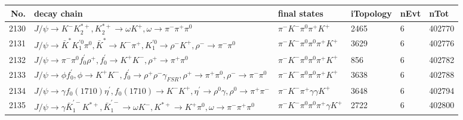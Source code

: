 \begin{table}[htbp] 
\begin{center}
\begin{small}
\begin{tabular}{rlllll}\hline\hline
 No. & decay chain & final states &  iTopology & nEvt & nTot \\\hline
2130&$J/\psi       \rightarrow K^{-}          K_2^{*+}       , K_2^{*+}        \rightarrow \omega         K^{+}          , \omega          \rightarrow \pi^{-}        \pi^{+}        \pi^{0}        $&$\pi^{-}        K^{-}          \pi^{0}        \pi^{+}        K^{+}          $& 2465&    6&402770\\
2131&$J/\psi       \rightarrow \bar{K}^{*}   K_1^{'0}      \pi^{0}        , \bar{K}^{*}    \rightarrow K^{-}          \pi^{+}        , K_1^{'0}       \rightarrow \rho^{-}      K^{+}          , \rho^{-}       \rightarrow \pi^{-}        \pi^{0}        $&$\pi^{-}        K^{-}          \pi^{0}        \pi^{0}        \pi^{+}        K^{+}          $& 3629&    6&402776\\
2132&$J/\psi       \rightarrow \pi^{-}        \pi^{0}        f^{'}_{0}     \rho^{+}      , f^{'}_{0}      \rightarrow K^{+}          K^{-}          , \rho^{+}       \rightarrow \pi^{+}        \pi^{0}        $&$\pi^{-}        K^{-}          \pi^{0}        \pi^{0}        \pi^{+}        K^{+}          $&  856&    6&402782\\
2133&$J/\psi       \rightarrow \phi           f^{'}_{0}     , \phi            \rightarrow K^{+}          K^{-}          , f^{'}_{0}      \rightarrow \rho^{+}      \rho^{-}      \gamma_{FSR} , \rho^{+}       \rightarrow \pi^{+}        \pi^{0}        , \rho^{-}       \rightarrow \pi^{-}        \pi^{0}        $&$\pi^{-}        K^{-}          \pi^{0}        \pi^{0}        \pi^{+}        K^{+}          $& 3638&    6&402788\\
2134&$J/\psi       \rightarrow \gamma       f_{0}(1710)    \eta^{\prime} , f_{0}(1710)     \rightarrow K^{-}          K^{+}          , \eta^{\prime}  \rightarrow \rho^{0}      \gamma       , \rho^{0}       \rightarrow \pi^{+}        \pi^{-}        $&$\pi^{-}        K^{-}          \pi^{+}        \gamma       \gamma       K^{+}          $& 3648&    6&402794\\
2135&$J/\psi       \rightarrow \gamma       \bar{K}_1^{'-}K^{*+}         , \bar{K}_1^{'-} \rightarrow \omega         K^{-}          , K^{*+}          \rightarrow K^{+}          \pi^{0}        , \omega          \rightarrow \pi^{-}        \pi^{+}        \pi^{0}        $&$\pi^{-}        K^{-}          \pi^{0}        \pi^{0}        \pi^{+}        \gamma       K^{+}          $& 2722&    6&402800\\

\end{tabular}
\end{small}
\end{center}
\end{table}
